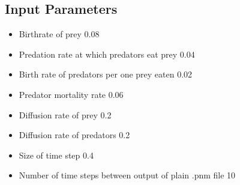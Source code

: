 \begin{appendices}
\section{Input Parameters}
\label{ap:inputparameters}
\begin{itemize}
	\item Birthrate of prey 0.08
	\item Predation rate at which predators eat prey 0.04
	\item Birth rate of predators per one prey eaten 0.02
	\item Predator mortality rate 0.06
	\item Diffusion rate of prey 0.2
	\item Diffusion rate of predators 0.2
	\item Size of time step 0.4
	\item Number of time steps between output of plain .pnm file 10
\end{itemize}



\end{appendices}





